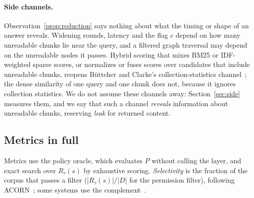 \paragraph{Side channels.}
Observation~\ref{prop:reduction} says nothing about what the timing or shape of an answer reveals.
Widening rounds, latency and the flag $c$ depend on how many unreadable chunks lie near the query, and
a filtered graph traversal may depend on the unreadable nodes it passes. Hybrid scoring that mixes
BM25 or IDF-weighted sparse scores, or normalizes or fuses scores over candidates that include
unreadable chunks, reopens B\"{u}ttcher and Clarke's collection-statistics
channel~\cite{buttcher2005security}; the dense similarity of one query and one chunk does not, because
it ignores collection statistics. We do not assume these channels away: Section~\ref{sec:side}
measures them, and we say that such a channel \emph{reveals} information about unreadable chunks,
reserving \emph{leak} for returned content.

\subsection{Metrics in full}\label{app:metrics}

Metrics use the policy oracle, which evaluates $P$ without calling the layer, and exact search over
$R_\tau(s)$ by exhaustive scoring. \emph{Selectivity} is the fraction of the corpus that passes a
filter ($|R_\tau(s)|/|D|$ for the permission filter), following ACORN~\cite{patel2024acorn}; some
systems use the complement~\cite{wang2021milvus}.

